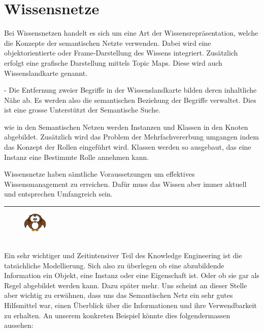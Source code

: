 \section{Wissensnetze}
\label{sec:wissensrepFormen_Wissensnetze}
Bei Wissensnetzen handelt es sich um eine Art der Wissensrepräsentation, welche die Konzepte der semantischen Netzte verwenden. Dabei wird eine objektorientierte oder Frame-Darstellung des Wissens integriert. Zusätzlich erfolgt eine grafische Darstellung mittels Topic Maps. Diese wird auch Wissenslandkarte genannt. 

- Die Entfernung zweier Begriffe in der Wissenslandkarte bilden deren inhaltliche Nähe ab. Es werden also die semantischen Beziehung der Begriffe verwaltet. Dies ist eine grosse Unterstützt der Semantische Suche.

wie in den Semantischen Netzen werden Instanzen und Klassen in den Knoten abgebildet. Zusätzlich wird das Problem der Mehrfachvererbung umgangen indem das Konzept der Rollen eingeführt wird. Klassen werden so ausgebaut, das eine Instanz eine Bestimmte Rolle annehmen kann.
	
Wissensnetze haben sämtliche Voraussetzungen um effektives Wissensmanagement zu erreichen. Dafür muss das Wissen aber immer aktuell und entsprechen Umfangreich sein.\\

\newpage
\noindent\rule[1ex]{\textwidth}{1pt}
\vspace{0.1pt}
\begin{figure}
    \vspace{-19pt}
    \includegraphics[width=0.1\textwidth]{bilder/owl.png}
\end{figure}\\
Ein sehr wichtiger und Zeitintensiver Teil des Knowledge Engineering ist die tatsächliche Modellierung. Sich also zu überlegen ob eine abzubildende Information ein Objekt, eine Instanz oder eine Eigenschaft ist. Oder ob sie gar als Regel abgebildet werden kann. Dazu später mehr. Uns scheint an dieser Stelle aber wichtig zu erwähnen, dass uns das Semantischen Netz ein sehr gutes Hilfsmittel war, einen Überblick über die Informationen und ihre Verwendbarkeit zu erhalten.
An unserem konkreten Beispiel könnte dies folgendermassen aussehen: 

